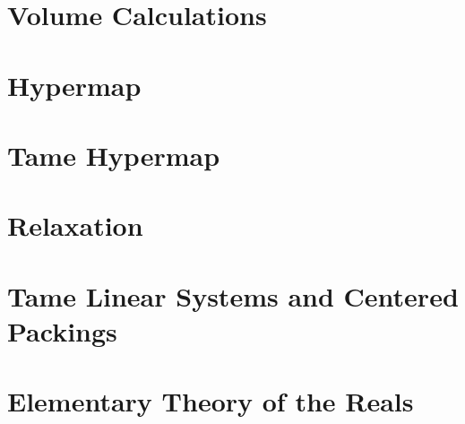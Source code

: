 \documentclass[cup9a]{cupbook}
\begin{document}
    \chapter{Volume Calculations}
    
    \chapter{Hypermap}\label{chap:hypermap}
    



    
    
    
    \chapter{Tame Hypermap}
    


    \label{part:lp}
    \label{part:lprelax}
    \chapter{Relaxation}
    
    \chapter{Tame Linear Systems and Centered Packings}
    



    \label{part:appendix}
    
    \chapter{Elementary Theory of the Reals}
     
\end{document}
